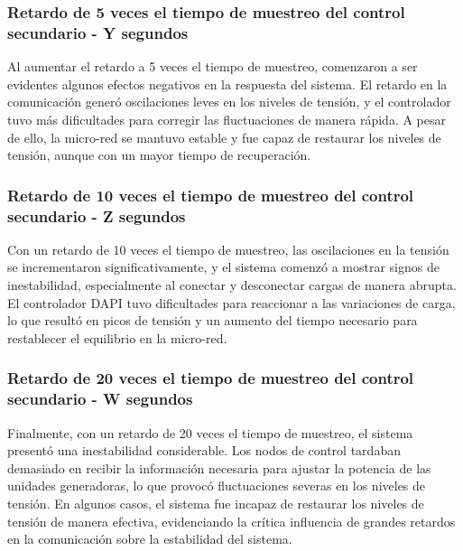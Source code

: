 \subsubsection{Retardo de 5 veces el tiempo de muestreo del control secundario - Y segundos}


Al aumentar el retardo a 5 veces el tiempo de muestreo, comenzaron a ser evidentes algunos efectos negativos en la respuesta del sistema. El retardo en la comunicación generó oscilaciones leves en los niveles de tensión, y el controlador tuvo más dificultades para corregir las fluctuaciones de manera rápida. A pesar de ello, la micro-red se mantuvo estable y fue capaz de restaurar los niveles de tensión, aunque con un mayor tiempo de recuperación.

\subsubsection{Retardo de 10 veces el tiempo de muestreo del control secundario - Z segundos}


Con un retardo de 10 veces el tiempo de muestreo, las oscilaciones en la tensión se incrementaron significativamente, y el sistema comenzó a mostrar signos de inestabilidad, especialmente al conectar y desconectar cargas de manera abrupta. El controlador DAPI tuvo dificultades para reaccionar a las variaciones de carga, lo que resultó en picos de tensión y un aumento del tiempo necesario para restablecer el equilibrio en la micro-red.

\subsubsection{Retardo de 20 veces el tiempo de muestreo del control secundario - W segundos}


Finalmente, con un retardo de 20 veces el tiempo de muestreo, el sistema presentó una inestabilidad considerable. Los nodos de control tardaban demasiado en recibir la información necesaria para ajustar la potencia de las unidades generadoras, lo que provocó fluctuaciones severas en los niveles de tensión. En algunos casos, el sistema fue incapaz de restaurar los niveles de tensión de manera efectiva, evidenciando la crítica influencia de grandes retardos en la comunicación sobre la estabilidad del sistema.\\

